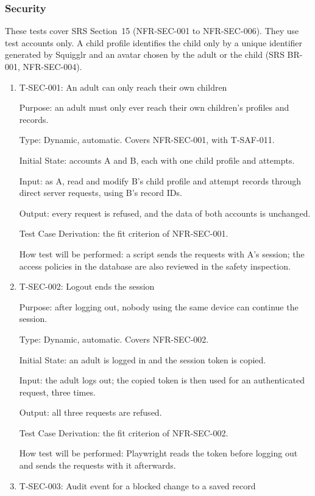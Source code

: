 \documentclass[12pt, titlepage]{article}
\newcommand{\testitem}[1]{\item #1\par\nopagebreak}
\begin{document}
\subsubsection{Security}
\label{sec:sec-tests}

These tests cover SRS Section~15 (NFR-SEC-001 to NFR-SEC-006). They use
test accounts only. A child profile identifies the child only by a unique
identifier generated by Squigglr and an avatar chosen by the adult or the child
(SRS BR-001, NFR-SEC-004).

\begin{enumerate}

\testitem{T-SEC-001: An adult can only reach their own children}

Purpose: an adult must only ever reach their own children's profiles and records.

Type: Dynamic, automatic. Covers NFR-SEC-001, with T-SAF-011.

Initial State: accounts A and B, each with one child profile and
attempts.

Input: as A, read and modify B's child profile and attempt records
through direct server requests, using B's record IDs.

Output: every request is refused, and the data of both accounts is unchanged.

Test Case Derivation: the fit criterion of NFR-SEC-001.

How test will be performed: a script sends the requests with A's session;
the access policies in the database are also reviewed in the safety
inspection.

\testitem{T-SEC-002: Logout ends the session}

Purpose: after logging out, nobody using the same device can continue the session.

Type: Dynamic, automatic. Covers NFR-SEC-002.

Initial State: an adult is logged in and the session token is copied.

Input: the adult logs out; the copied token is then used for an
authenticated request, three times.

Output: all three requests are refused.

Test Case Derivation: the fit criterion of NFR-SEC-002.

How test will be performed: Playwright reads the token before logging out
and sends the requests with it afterwards.

\testitem{T-SEC-003: Audit event for a blocked change to a saved record}


\end{enumerate}
\end{document}
